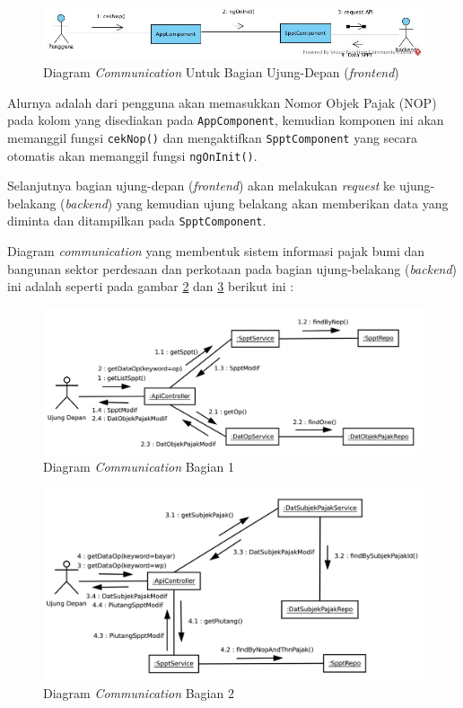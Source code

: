 \documentclass[pdftex,12pt, oneside]{article}
\begin{document}
\begin{figure}[H]
	\centering
	\includegraphics[width=1\textwidth]{./resources/comm-dia-fe}
	\caption{Diagram \textit{Communication} Untuk Bagian Ujung-Depan (\textit{frontend})}
	\label{fig:comm-dia-fe}
\end{figure}

Alurnya adalah dari pengguna akan memasukkan Nomor Objek Pajak (NOP) pada kolom yang disediakan pada \texttt{AppComponent}, kemudian komponen ini akan memanggil fungsi \texttt{cekNop()} dan mengaktifkan \texttt{SpptComponent} yang secara otomatis akan memanggil fungsi \texttt{ngOnInit()}.

Selanjutnya bagian ujung-depan (\textit{frontend}) akan melakukan \textit{request} ke ujung-belakang (\textit{backend}) yang kemudian ujung belakang akan memberikan data yang diminta dan ditampilkan pada \texttt{SpptComponent}.

Diagram \textit{communication} yang membentuk sistem informasi pajak bumi dan bangunan sektor perdesaan dan perkotaan pada bagian ujung-belakang (\textit{backend}) ini adalah seperti pada gambar \ref{fig:comm-dia-be-1} dan \ref{fig:comm-dia-be-2} berikut ini :

\begin{figure}[H]
	\centering
	\includegraphics[width=1\textwidth]{./resources/comm-dia-1}
	\caption{Diagram \textit{Communication} Bagian 1}
	\label{fig:comm-dia-be-1}
\end{figure}

\begin{figure}[H]
	\centering
	\includegraphics[width=1\textwidth]{./resources/comm-dia-2}
	\caption{Diagram \textit{Communication} Bagian 2}
	\label{fig:comm-dia-be-2}
\end{figure}
\end{document}

